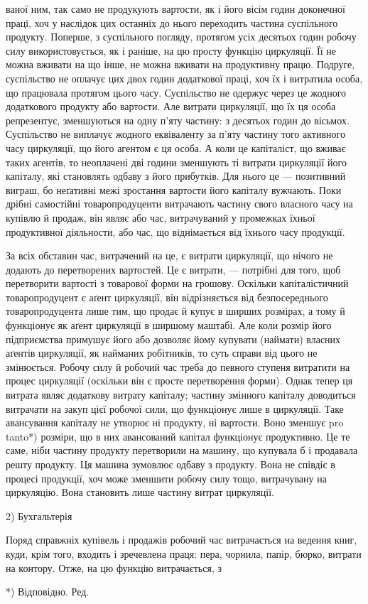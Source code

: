 ваної ним, так само не продукують вартости, як і його вісім годин
доконечної праці, хоч у наслідок цих останніх до нього переходить
частина суспільного продукту. Поперше, з суспільного погляду, протягом
усіх десятьох годин робочу силу використовується, як і раніше, на цю
просту функцію циркуляції. Її не можна вживати на що інше, не
можна вживати на продуктивну працю. Подруге, суспільство не оплачує
цих двох годин додаткової праці, хоч їх і витратила особа, що
працювала протягом цього часу. Суспільство не одержує через це жодного
додаткового продукту або вартости. Але витрати циркуляції, що їх
ця особа репрезентує, зменшуються на одну п’яту частину: з десятьох
годин до вісьмох. Суспільство не виплачує жодного еквіваленту за п’яту
частину того активного часу циркуляції, що його агентом є ця особа.
А коли це капіталіст, що вживає таких агентів, то неоплачені дві години
зменшують ті витрати циркуляції його капіталу, які становлять одбаву з його
прибутків. Для нього це — позитивний виграш, бо неґативні межі зростання
вартости його капіталу вужчають. Поки дрібні самостійні товаропродуценти
витрачають частину свого власного часу на купівлю й продаж,
він являє або час, витрачуваний у промежках їхньої продуктивної
діяльности, або час, що віднімається від їхнього часу продукції.

За всіх обставин час, витрачений на це, є витрати циркуляції, що
нічого не додають до перетворених вартостей. Це є витрати, — потрібні
для того, щоб перетворити вартості з товарової форми на грошову.
Оскільки капіталістичний товаропродуцент є аґент циркуляції, він відрізняється
від безпосереднього товаропродуцента лише тим, що продає й
купує в ширших розмірах, а тому й функціонує як аґент циркуляції в
ширшому маштабі. Але коли розмір його підприємства примушує його
або дозволяє йому купувати (наймати) власних аґентів циркуляції, як
найманих робітників, то суть справи від цього не змінюється. Робочу
силу й робочий час треба до певного ступеня витратити на процес циркуляції
(оскільки він є просте перетворення форми). Однак тепер ця витрата
являє додаткову витрату капіталу; частину змінного капіталу доводиться
витрачати на закуп цієї робочої сили, що функціонує лише в
циркуляції. Таке авансування капіталу не утворює ні продукту, ні
вартости. Воно зменшує pro tanto*) розміри, що в них авансований
капітал функціонує продуктивно. Це те саме, ніби частину продукту
перетворили на машину, що купувала б і продавала решту продукту. Ця
машина зумовлює одбаву з продукту. Вона не співдіє в процесі продукції,
хоч може зменшити робочу силу тощо, витрачувану на циркуляцію.
Вона становить лише частину витрат циркуляції.

2) Бухгальтерія

Поряд справжніх купівель і продажів робочий час витрачається на
ведення книг, куди, крім того, входить і зречевлена праця: пера, чорнила,
папір, бюрко, витрати на контору. Отже, на цю функцію витрачається, з

*) Відповідно. Ред.
